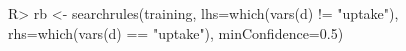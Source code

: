 \begin{Schunk}
% --begin: "pbld4"
\begin{Sinput}
R> rb <- searchrules(training,
                     lhs=which(vars(d) != "uptake"),
                     rhs=which(vars(d) == "uptake"),
                     minConfidence=0.5)
\end{Sinput}
%
% --end: "pbld4"
\end{Schunk}
